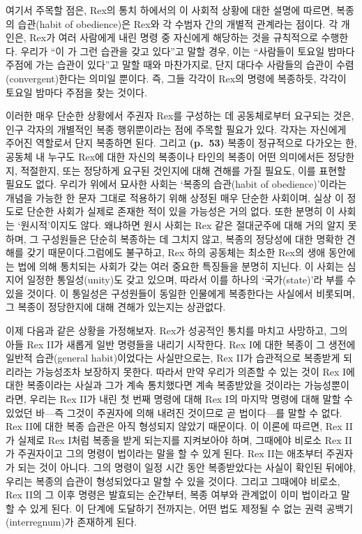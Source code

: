여기서 주목할 점은, Rex의 통치 하에서의 이 사회적 상황에 대한 설명에
따르면, 복종의 습관(habit of obedience)은 Rex와 각 수범자 간의 개별적
관계라는 점이다. 각 개인은, Rex가 여러 사람에게 내린 명령 중 자신에게
해당하는 것을 규칙적으로 수행한다. 우리가 ``이 가 그런 습관을 갖고 있다''고 말할 경우, 이는 ``사람들이
토요일 밤마다 주점에 가는 습관이 있다''고 말할 때와 마찬가지로, 단지
대다수 사람들의 습관이 수렴(convergent)한다는 의미일 뿐이다. 즉, 그들
각각이 Rex의 명령에 복종하듯, 각각이 토요일 밤마다 주점을 찾는 것이다.

이러한 매우 단순한 상황에서 주권자 Rex를 구성하는 데 공동체로부터
요구되는 것은, 인구 각자의 개별적인 복종 행위뿐이라는 점에 주목할 필요가
있다. 각자는 자신에게 주어진 역할로서 단지 복종하면 된다. 그리고
\textbf{(p.~53)} 복종이 정규적으로 다가오는 한, 공동체 내 누구도 Rex에
대한 자신의 복종이나 타인의 복종이 어떤 의미에서든 정당한지, 적절한지,
또는 정당하게 요구된 것인지에 대해 견해를 가질 필요도, 이를 표현할
필요도 없다. 우리가 위에서 묘사한 사회는 `복종의 습관(habit of
obedience)'이라는 개념을 가능한 한 문자 그대로 적용하기 위해 상정된 매우
단순한 사회이며, 실상 이 정도로 단순한 사회가 실제로 존재한 적이 있을
가능성은 거의 없다. 또한 분명히 이 사회는 `원시적'이지도 않다. 왜냐하면
원시 사회는 Rex 같은 절대군주에 대해 거의 알지 못하며, 그 구성원들은
단순히 복종하는 데 그치지 않고, 복종의 정당성에 대한 명확한 견해를 갖기
때문이다.그럼에도 불구하고, Rex 하의 공동체는 최소한 Rex의 생애 동안에는
법에 의해 통치되는 사회가 갖는 여러 중요한 특징들을 분명히 지닌다. 이
사회는 심지어 일정한 통일성(unity)도 갖고 있으며, 따라서 이를 하나의
`국가(state)'라 부를 수 있을 것이다. 이 통일성은 구성원들이 동일한
인물에게 복종한다는 사실에서 비롯되며, 그 복종이 정당한지에 대해 견해가
있는지는 상관없다.

이제 다음과 같은 상황을 가정해보자. Rex가 성공적인 통치를 마치고
사망하고, 그의 아들 Rex II가 새롭게 일반 명령들을 내리기 시작한다. Rex
I에 대한 복종이 그 생전에 일반적 습관(general habit)이었다는
사실만으로는, Rex II가 습관적으로 복종받게 되리라는 가능성조차 보장하지
못한다. 따라서 만약 우리가 의존할 수 있는 것이 Rex I에 대한 복종이라는
사실과 그가 계속 통치했다면  계속 복종받았을 것이라는
가능성뿐이라면, 우리는 Rex II가 내린 첫 번째 명령에 대해 Rex I의 마지막
명령에 대해 말할 수 있었던 바---즉 그것이 주권자에 의해 내려진 것이므로
곧 법이다---를 말할 수 없다. Rex II에 대한 복종 습관은 아직 형성되지
않았기 때문이다. 이 이론에 따르면, Rex II가 실제로 Rex I처럼 복종을 받게
되는지를 지켜보아야 하며, 그때에야 비로소 Rex II가 주권자이고 그의
명령이 법이라는 말을 할 수 있게 된다. Rex II는 애초부터 주권자가 되는
것이 아니다. 그의 명령이 일정 시간 동안 복종받았다는 사실이 확인된
뒤에야, 우리는 복종의 습관이 형성되었다고 말할 수 있을 것이다. 그리고
그때에야 비로소, Rex II의 그 이후 명령은 발효되는 순간부터, 복종 여부와
관계없이 이미 법이라고 말할 수 있게 된다. 이 단계에 도달하기 전까지는,
어떤 법도 제정될 수 없는 권력 공백기(interregnum)가 존재하게 된다.

